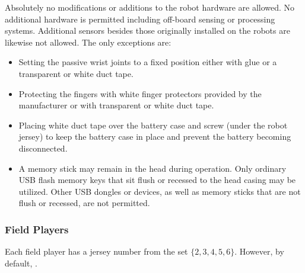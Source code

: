 Absolutely no modifications or additions to the robot hardware are allowed. No additional hardware is permitted including off-board sensing or processing systems. Additional sensors besides those originally installed on the robots are likewise not allowed. The only exceptions are:
\begin{itemize}
	\item Setting the passive wrist joints to a fixed position either with glue or a transparent or white duct tape.
	\item Protecting the fingers with white finger protectors provided by the manufacturer or with transparent or white duct tape.
	\item Placing white duct tape over the battery case and screw (under the robot jersey) to keep the battery case in place and prevent the battery becoming disconnected.
	\item A memory stick may remain in the head during operation.  Only ordinary USB flash memory keys that sit flush or recessed to the head casing may be utilized. Other USB dongles or devices, as well as memory sticks that are not flush or recessed, are not permitted.
\end{itemize}

\subsubsection{Field Players}
\label{sec:field_players}
Each field player has a jersey number from the set $\{2, 3, 4, 5, 6\}$. However, by default, . 



